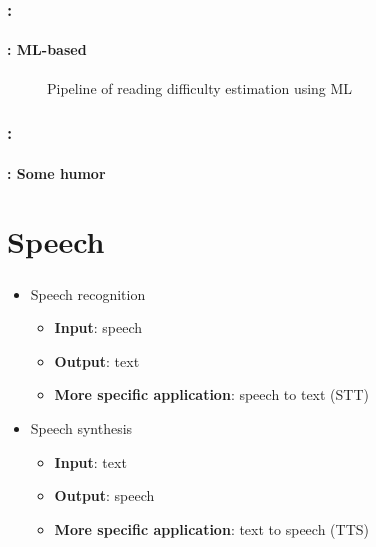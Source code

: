 \documentclass[xcolor=table]{beamer}
\begin{document}
\begin{frame}
	\frametitle{\insertshortsubtitle: \insertsection}
	\framesubtitle{\insertsubsection: ML-based}
	
	\begin{figure}
		\centering
		\caption{Pipeline of reading difficulty estimation using ML \cite{2014-collins}}
	\end{figure}
	
\end{frame}

\begin{frame}
	\frametitle{\insertshortsubtitle: \insertsection}
	\framesubtitle{\insertsubsection: Some humor}
	
	\begin{center}
	\end{center}
	
\end{frame}

\section{Speech}

\begin{frame}
	\frametitle{\insertshortsubtitle}
	\framesubtitle{\insertsection}
	
	\begin{itemize}
		\item Speech recognition
		\begin{itemize}
			\item \textbf{Input}: speech
			\item \textbf{Output}: text
			\item \textbf{More specific application}: speech to text (STT)
		\end{itemize}
		\item Speech synthesis
		\begin{itemize}
			\item \textbf{Input}: text
			\item \textbf{Output}: speech
			\item \textbf{More specific application}: text to speech (TTS)
		\end{itemize}
	\end{itemize}

\end{frame}
\end{document}
